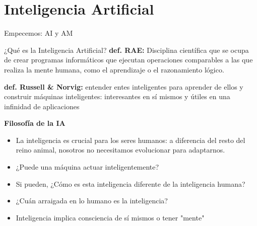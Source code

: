 \documentclass[9pt]{beamer}
\begin{document}
\section{Inteligencia Artificial}


\begin{frame}
\centerline{\large Empecemos: AI y AM}
\thispagestyle{empty}
\end{frame}




\begin{frame}{¿Qué es la Inteligencia Artificial?}
\textbf{def. RAE:} Disciplina científica que se ocupa de crear programas
informáticos que ejecutan operaciones comparables a las que realiza
la mente humana, como el aprendizaje o el razonamiento lógico.\\
\vspace{2em}

\textbf{def. Russell \& Norvig:} entender entes inteligentes para aprender
de ellos y construir máquinas inteligentes: interesantes en sí mismos
y útiles en una infinidad de aplicaciones
\vspace{2em}


\textbf{Filosofía de la IA}
\begin{itemize}
  \item La inteligencia es crucial para los seres humanos: a diferencia del resto del reino animal, nosotros no necesitamos evolucionar para adaptarnos.
  \item ¿Puede una máquina actuar inteligentemente?
  \item Si pueden, ¿Cómo es esta inteligencia diferente de la inteligencia humana?
  \item ¿Cuán arraigada en lo humano es la inteligencia?
  \item Inteligencia implica consciencia de sí mismos o tener "mente"
\end{itemize}

\end{frame}
\end{document}
